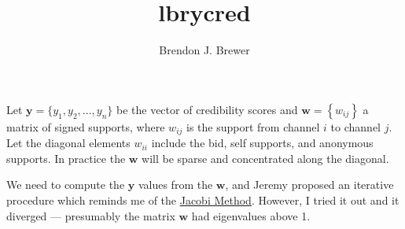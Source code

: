 \documentclass[a4paper, 12pt]{article}
\title{lbrycred}
\author{Brendon J. Brewer}
\date{}
\begin{document}
\maketitle


\setlength{\parindent}{0pt}
\setlength{\parskip}{8pt}

Let $\boldsymbol{y} = \{y_1, y_2, ..., y_n\}$ be the vector of credibility
scores and $\boldsymbol{w} = \left\{w_{ij}\right\}$
a matrix of signed supports, where
$w_{ij}$ is the support from channel $i$ to channel $j$. Let the diagonal
elements $w_{ii}$ include the bid, self supports, and anonymous supports.
In practice the $\boldsymbol{w}$ will be sparse and concentrated along the
diagonal.

We need to compute the $\boldsymbol{y}$ values from the $\boldsymbol{w}$,
and Jeremy proposed an iterative procedure which reminds me of the
\href{https://en.wikipedia.org/wiki/Jacobi_method}{Jacobi Method}. However,
I tried it out and it diverged --- presumably the matrix $\boldsymbol{w}$ had
eigenvalues above 1.



\end{document}

